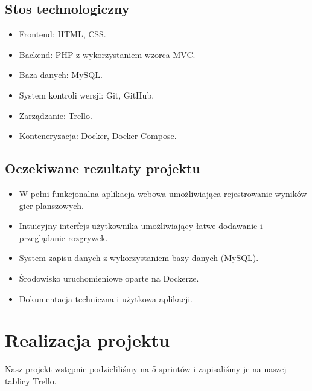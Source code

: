 \documentclass[12pt,a4paper]{article}
\begin{document}
\subsection{Stos technologiczny}
\begin{itemize}
	\item Frontend: HTML, CSS.
	\item Backend: PHP z wykorzystaniem wzorca MVC.
	\item Baza danych: MySQL.
	\item System kontroli wersji: Git, GitHub.
	\item Zarządzanie: Trello.
	\item Konteneryzacja: Docker, Docker Compose.
\end{itemize}

\subsection{Oczekiwane rezultaty projektu}
\begin{itemize}
	\item W pełni funkcjonalna aplikacja webowa umożliwiająca rejestrowanie wyników gier planszowych.
	\item Intuicyjny interfejs użytkownika umożliwiający łatwe dodawanie i przeglądanie rozgrywek.
	\item System zapisu danych z wykorzystaniem bazy danych (MySQL).
	\item Środowisko uruchomieniowe oparte na Dockerze.
	\item Dokumentacja techniczna i użytkowa aplikacji.
\end{itemize}
\newpage
\section{Realizacja projektu}
Nasz projekt wstępnie podzieliliśmy na 5 sprintów i zapisaliśmy je na naszej tablicy Trello.
\end{document}
